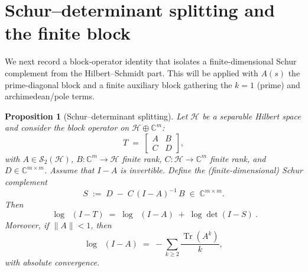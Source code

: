 \documentclass[11pt]{article}
\newtheorem{proposition}[theorem]{Proposition}
\theoremstyle{definition}
\theoremstyle{remark}
\newcommand{\C}{\mathbb{C}}
\newcommand{\HS}{\mathcal{S}_2}
\DeclareMathOperator{\Tr}{Tr}
\DeclareMathOperator{\dettwo}{det_2}
\begin{document}
\section{Schur--determinant splitting and the finite block}\label{sec:schur-split}
We next record a block-operator identity that isolates a finite-dimensional Schur complement from the Hilbert--Schmidt part. This will be applied with \(A(s)\) the prime-diagonal block and a finite auxiliary block gathering the \(k=1\) (prime) and archimedean/pole terms.

\begin{proposition}[Schur--determinant splitting]\label{prop:schur-split}
Let \(\mathcal H\) be a separable Hilbert space and consider the block operator on \(\mathcal H\oplus\C^m\):
\[
 T\;=\;\begin{bmatrix}A & B\\ C & D\end{bmatrix},
\]
with \(A\in\HS(\mathcal H)\), \(B:\C^m\to\mathcal H\) finite rank, \(C:\mathcal H\to\C^m\) finite rank, and \(D\in\C^{m\times m}\). Assume that \(I-A\) is invertible. Define the (finite-dimensional) Schur complement
\[
 S\;:=\;D\; -\; C\,(I-A)^{-1}\,B\;\in\;\C^{m\times m}.
\]
Then
\[
 \boxed{\ \log\dettwo(I-T)\;=\;\log\dettwo(I-A)\; +\; \log\det(I-S)\ }.
\]
Moreover, if \(\|A\|<1\), then
\[
 \log\dettwo(I-A)\;=\; -\sum_{k\ge 2}\frac{\Tr(A^k)}{k},
\]
with absolute convergence.
\end{proposition}
\end{document}
